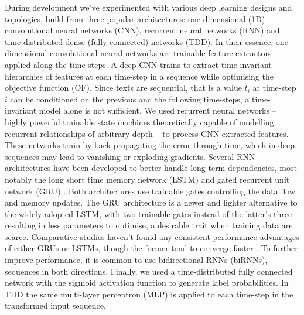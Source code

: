 \documentclass[twocolumn]{bmcart}%
\begin{document}
During development we've experimented with various deep learning designs and topologies, build from three popular architectures: one-dimensional (1D) convolutional neural networks (CNN), recurrent neural networks (RNN) and time-distributed dense (fully-connected) networks (TDD).
In their essence, one-dimensional convolutional neural networks are trainable feature extractors applied along the time-steps.
A deep CNN \cite{Lopez2017} trains to extract time-invariant hierarchies of features at each time-step in a sequence while optimising the objective function (OF).
Since texts are sequential, that is a value ${t}_{i}$ at time-step ${i}$ can be conditioned on the previous and the following time-steps, a time-invariant model alone is not sufficient.
We used recurrent neural networks -- highly powerful trainable state machines theoretically capable of modelling recurrent relationships of arbitrary depth -- to process CNN-extracted features.
These networks train by back-propagating the error through time, which in deep sequences may lead to vanishing or exploding gradients.
Several RNN architectures have been developed to better handle long-term dependencies, most notably the long short time memory network (LSTM) and gated recurrent unit network (GRU) \cite{Chung2014}.
Both architectures use trainable gates controlling the data flow and memory updates.
The GRU architecture is a newer and lighter alternative to the widely adopted LSTM, with two trainable gates instead of the latter's three resulting in less parameters to optimise, a desirable trait when training data are scarce.
Comparative studies haven’t found any consistent performance advantages of either GRUs or LSTMs, though the former tend to converge faster \cite{Jozefowicz2015}.
To further improve performance, it is common to use bidirectional RNNs (biRNNs),  sequences in both directions. 
Finally, we used a time-distributed fully connected network with the sigmoid activation function to generate label probabilities.
In TDD the same  multi-layer perceptron (MLP) is applied to each time-step in the transformed input sequence.
\end{document}
